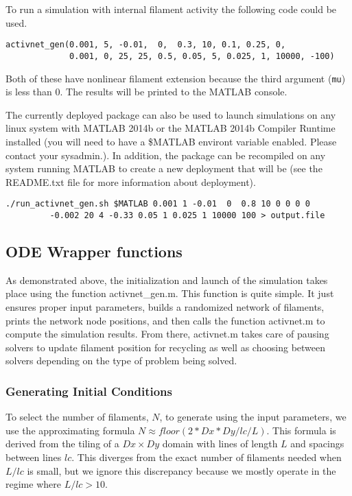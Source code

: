To run a simulation with internal filament activity the following code could be used.

\begin{verbatim}
activnet_gen(0.001, 5, -0.01,  0,  0.3, 10, 0.1, 0.25, 0, 
             0.001, 0, 25, 25, 0.5, 0.05, 5, 0.025, 1, 10000, -100)
\end{verbatim}

Both of these have nonlinear filament extension because the third argument (\texttt{mu}) is less than 0.  The results will be printed to the MATLAB console.

The currently deployed package can also be used to launch simulations on any linux system with MATLAB 2014b or the MATLAB 2014b Compiler Runtime installed (you will need to have a \$MATLAB environt variable enabled.  Please contact your sysadmin.).  In addition, the package can be recompiled on any system running MATLAB to create a new deployment that will be (see the README.txt file for more information about deployment).  

\begin{verbatim}
./run_activnet_gen.sh $MATLAB 0.001 1 -0.01  0  0.8 10 0 0 0 0 
         -0.002 20 4 -0.33 0.05 1 0.025 1 10000 100 > output.file
\end{verbatim}






\subsection{ODE Wrapper functions }

As demonstrated above, the initialization and launch of the simulation takes place using the function activnet\_gen.m.  This function is quite simple. It just ensures proper input parameters, builds a randomized network of filaments, prints the network node positions, and then calls the function activnet.m to compute the simulation results.  From there, activnet.m takes care of pausing solvers to update filament position for recycling as well as choosing between solvers depending on the type of problem being solved.  

\subsubsection{Generating Initial Conditions}

To select the number of filaments, $N$, to generate using the input parameters, we use the approximating formula $N \approx floor(2*Dx*Dy/lc/L)$.  This formula is derived from the tiling of a $Dx \times Dy$ domain with lines of length $L$ and spacings between lines $lc$.  This diverges from the exact number of filaments needed when $L/lc$ is small, but we ignore this discrepancy because we mostly operate in the regime where $L/lc>10$.

